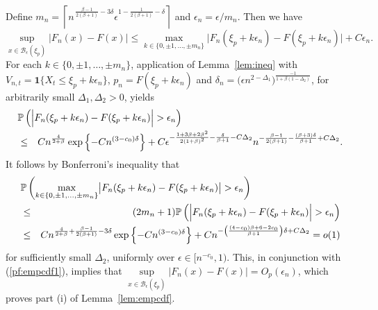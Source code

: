 \documentclass[a4paper, 12pt]{article}
\theoremstyle{plain}
\theoremstyle{definition}
\newcommand{\prob}{{\Bbb P}}
\begin{document}
Define $m_n=\left\lceil n^{\,\frac{\beta-1}{2(\beta+1)}-3\delta}
\epsilon^{1-\frac{1}{2(\beta+1)}-\delta}\right\rceil$ and $\epsilon_n=\epsilon/m_n$.
Then we have
\begin{equation}
\label{pf:empcdf1}
\underset{x\in\mathscr{B}_\epsilon(\xi_p)}\sup
\big|F_n(x)-F(x)\big|
\le \underset{k\in\{0,\pm 1,\ldots,\pm m_n\}}
\max\big|F_n(\xi_p+k\epsilon_n)-F(\xi_p+k\epsilon_n)\big|+C\epsilon_n.
\end{equation}
For each $k\in\{0,\pm 1,\ldots,\pm m_n\}$, application of
Lemma~\ref{lem:ineq} with
$V_{n,t}=\pmb{1}\{X_t\le\xi_p+k\epsilon_n\}$,
$p_n=F(\xi_p+k\epsilon_n)$ and
$\delta_n=\big(\epsilon n^{2-\Delta_1}\big)^{\frac{-1}{1+\beta(1-\Delta_2)}}$,
for arbitrarily small $\Delta_1,\Delta_2>0$, yields
\begin{eqnarray*}
\lefteqn{\prob\left(\Big|
F_n(\xi_p+k\epsilon_n)-F(\xi_p+k\epsilon_n)\Big|>\epsilon_n\right)}\nonumber\\
&\le&C
n^{\frac{4}{2+\beta}}
\exp\left\{-C
n^{(3-c_0)\delta}
\right\}+C\epsilon^{-\frac{1 + 3 \beta + 2 \beta^2}{2 (1 + \beta)^2}-
\frac{\delta}{
\beta+1} - C\Delta_2}
n^{-\frac{\beta - 1}{2 ( \beta + 1)} -
\frac{(\beta+ 3)\delta}{\beta+1}+C\Delta_2}.
\end{eqnarray*}
It follows by Bonferroni's inequality that
\begin{eqnarray*}
\lefteqn{\prob\left(\underset{k\in\{0,\pm 1,\ldots,\pm m_n\}}
\max\big|F_n(\xi_p+k\epsilon_n)-F(\xi_p+k\epsilon_n)\big|>\epsilon_n\right)}\nonumber\\
&\le&(2m_n+1)
\prob\left(\Big|
F_n(\xi_p+k\epsilon_n)-F(\xi_p+k\epsilon_n)\Big|>\epsilon_n\right)\\
&\le&Cn^{\frac{4}{2+\beta}+\frac{\beta-1}{2(\beta+1)}-3\delta}
\exp\left\{-C
n^{(3-c_0)\delta}
\right\}+C
n^{-\left(
\frac{(4-c_0)\beta+ 6-2c_0}{\beta+1}\right)\delta+C\Delta_2}=o(1)
\end{eqnarray*}
for sufficiently small $\Delta_2$,
uniformly over $\epsilon\in\big[n^{-c_0},1\big)$.
This, in conjunction with (\ref{pf:empcdf1}), implies  that
$\underset{x\in\mathscr{B}_\epsilon(\xi_p)}\sup
\big|F_n(x)-F(x)\big|=O_p(\epsilon_n)$, which proves part (i) of
Lemma~\ref{lem:empcdf}.
\end{document}
